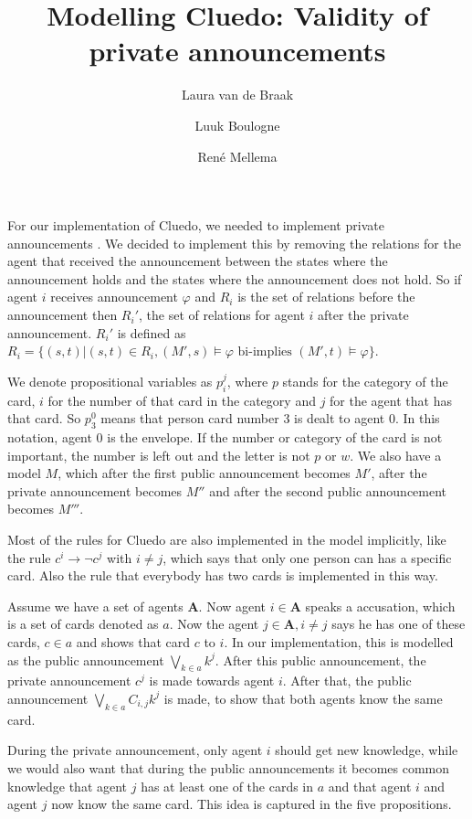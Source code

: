 \documentclass[a4paper, 10pt]{article}
\title{Modelling Cluedo: Validity of private announcements}
\author{Laura van de Braak \and Luuk Boulogne \and Ren\'e Mellema}
\date{}
\newcommand{\impl}{\rightarrow}
\newcommand{\A}{\mathbf{A}}
\begin{document}
\maketitle

For our implementation of Cluedo, we needed to implement private
announcements \citep[see][chapter 6]{ditmarsch2007dynamic}. We decided to
implement this by removing the relations for the agent that received the
announcement between the states where the announcement holds and the states
where the announcement does not hold. So if agent $i$ receives announcement
$\varphi$ and $R_i$ is the set of relations before the announcement then
$R_i'$, the set of relations for agent $i$ after the private announcement.
$R_i'$ is defined as $R_i = \{(s, t) | (s, t) \in R_i, (M', s) \models
\varphi \text{ bi-implies } (M', t) \models \varphi\}$.

We denote propositional variables as $p_i^j$, where $p$ stands for the
category of the card, $i$ for the number of that card in the category and
$j$ for the agent that has that card. So $p_3^0$ means that person card
number 3 is dealt to agent 0. In this notation, agent 0 is the envelope.
If the number or category of the card is not important, the number is left
out and the letter is not $p$ or $w$.  We also have a model $M$, which
after the first public announcement becomes $M'$, after the private
announcement becomes $M''$ and after the second public announcement becomes
$M'''$.

Most of the rules for Cluedo are also implemented in the model implicitly,
like the rule $c^i \impl \neg c^j$ with $i \not = j$, which says that only
one person can has a specific card. Also the rule that everybody has two
cards is implemented in this way.

Assume we have a set of agents $\A$. Now agent $i \in \A$ speaks a
accusation, which is a set of cards denoted as $a$. Now the agent $j \in
\A, i \not = j$ says he has one of these cards, $c \in a$ and shows that
card $c$ to $i$.  In our implementation, this is modelled as the public
announcement $\bigvee_{k \in a} k^j$. After this public announcement, the
private announcement $c^j$ is made towards agent $i$. After that, the
public announcement $\bigvee_{k \in a} C_{i, j} k^j$ is made, to show that
both agents know the same card. 

During the private announcement, only agent $i$ should get new knowledge,
while we would also want that during the public announcements it becomes
common knowledge that agent $j$ has at least one of the cards in $a$ and
that agent $i$ and agent $j$ now know the same card. This idea is captured
in the five propositions.
\end{document}
